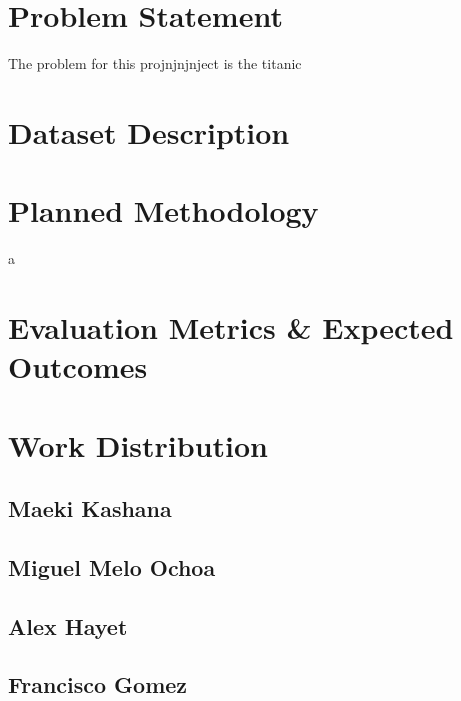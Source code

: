 \documentclass{APA}
\begin{document}
\tableofcontents

\section{Problem Statement}
\cite{titanic}
The problem for this projnjnjnject is the titanic
\newpage



\section{Dataset Description}

\newpage



\section{Planned Methodology}
a
\newpage



\section{Evaluation Metrics \& Expected Outcomes}

\newpage



\section{Work Distribution}

\subsection{Maeki Kashana}

\subsection{Miguel Melo Ochoa}

\subsection{Alex Hayet}

\subsection{Francisco Gomez}

\printbibliography
\end{document}
